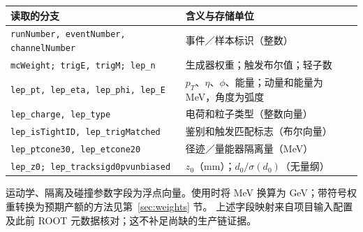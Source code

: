 \documentclass[11pt,a4paper,fontset=fandol,scheme=plain]{ctexart}
\begin{document}
\begingroup
\small
\renewcommand{\arraystretch}{1.13}
\begin{tabularx}{\linewidth}{@{}p{.62\linewidth}Y@{}}
\toprule
读取的分支 & 含义与存储单位 \\
\midrule
\texttt{runNumber, eventNumber, channelNumber} & 事件／样本标识（整数） \\
\texttt{mcWeight; trigE, trigM; lep\_n} & 生成器权重；触发布尔值；轻子数 \\
\texttt{lep\_pt, lep\_eta, lep\_phi, lep\_E} & $p_T$、$\eta$、$\phi$、能量；动量和能量为 MeV，角度为弧度 \\
\texttt{lep\_charge, lep\_type} & 电荷和粒子类型（整数向量） \\
\texttt{lep\_isTightID, lep\_trigMatched} & 鉴别和触发匹配标志（布尔向量） \\
\texttt{lep\_ptcone30, lep\_etcone20} & 径迹／量能器隔离量（MeV） \\
\texttt{lep\_z0; lep\_tracksigd0pvunbiased} & $z_0$（mm）；$d_0/\sigma(d_0)$（无量纲） \\
\bottomrule
\end{tabularx}
\endgroup

运动学、隔离及碰撞参数字段为浮点向量。使用时将 MeV 换算为 GeV；带符号权重转换为预期产额的方法见第~\ref{sec:weights} 节。
上述字段映射来自项目输入配置及此前 ROOT 元数据核对；这不补足尚缺的生产链证据。
\end{document}
